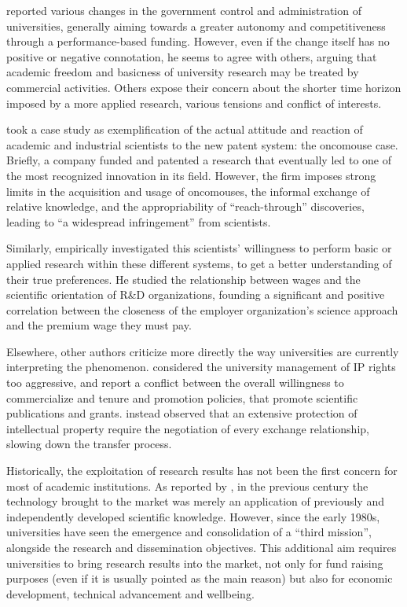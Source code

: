 \citet{Rasmussen2006} reported various changes in the government control and administration of universities, generally aiming towards a greater autonomy and competitiveness through a performance-based funding. However, even if the change itself has no positive or negative connotation, he seems to agree with others, arguing that academic freedom and basicness of university research may be treated by commercial activities. Others expose their concern about the shorter time horizon imposed by a more applied research, various tensions and conflict of interests. 

\citet{Murray2005} took a case study as exemplification of the actual attitude and reaction of academic and industrial scientists to the new patent system: the oncomouse case. Briefly, a company funded and patented a research that eventually led to one of the most recognized innovation in its field. However, the firm imposes strong limits in the acquisition and usage of oncomouses, the informal exchange of relative knowledge, and the appropriability of \enquote{reach-through} discoveries, leading to \enquote{a widespread infringement} from scientists. 

Similarly, \citet{Stern2004} empirically investigated this scientists' willingness to perform basic or applied research within these different systems, to get a better understanding of their true preferences. He studied the relationship between wages and the scientific orientation of R\&D organizations, founding a significant and positive correlation between the closeness of the employer organization's science approach and the premium wage they must pay.

Elsewhere, other authors criticize more directly the way universities are currently interpreting the phenomenon. \citet{Siegel2003a} considered the university management of IP rights too aggressive, and report a conflict between the overall willingness to commercialize and tenure and promotion policies, that promote scientific publications and grants. \citet{Murray2005} instead observed that an extensive protection of intellectual property require the negotiation of every exchange relationship, slowing down the transfer process.

Historically, the exploitation of research results has not been the first concern for most of academic institutions. As reported by \citet{Balconi2006}, in the previous century the technology brought to the market was merely an application of previously and independently developed scientific knowledge. However, since the early 1980s, universities have seen the emergence and consolidation of a \enquote{third mission}, alongside the research and dissemination objectives. This additional aim requires universities to bring research results into the market, not only for fund raising purposes (even if it is usually pointed as the main reason) but also for economic development, technical advancement and wellbeing. 

